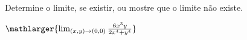 Determine o limite, se existir, ou mostre que o limite não existe.

\item$\mathlarger{\lim_{(x,y)\rightarrow(0,0)} \frac{6x^3y}{2x^4+y^4}}$

